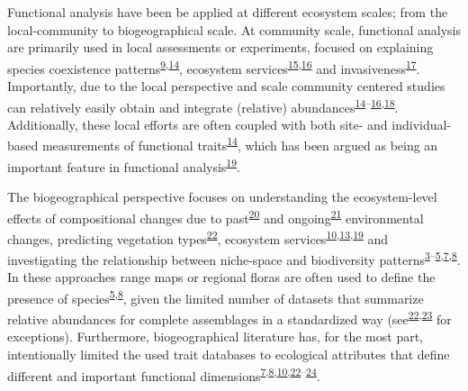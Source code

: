 \documentclass[
  10pt,
]{article}
\begin{document}
Functional analysis have been be applied at different ecosystem scales; from the local-community to biogeographical scale. At community scale, functional analysis are primarily used in local assessments or experiments, focused on explaining species coexistence patterns\textsuperscript{\protect\hyperlink{ref-McGill2006}{9},\protect\hyperlink{ref-Weiher1998}{14}}, ecosystem services\textsuperscript{\protect\hyperlink{ref-Scherer2008}{15},\protect\hyperlink{ref-Zavaleta2010}{16}} and invasiveness\textsuperscript{\protect\hyperlink{ref-Hejda2013}{17}}. Importantly, due to the local perspective and scale community centered studies can relatively easily obtain and integrate (relative) abundances\textsuperscript{\protect\hyperlink{ref-Weiher1998}{14}--\protect\hyperlink{ref-Zavaleta2010}{16},\protect\hyperlink{ref-Catford2019}{18}}. Additionally, these local efforts are often coupled with both site- and individual-based measurements of functional traits\textsuperscript{\protect\hyperlink{ref-Weiher1998}{14}}, which has been argued as being an important feature in functional analysis\textsuperscript{\protect\hyperlink{ref-Yang2018}{19}}.

The biogeographical perspective focuses on understanding the ecosystem-level effects of compositional changes due to past\textsuperscript{\protect\hyperlink{ref-Svenning2015}{20}} and ongoing\textsuperscript{\protect\hyperlink{ref-Culshaw2021}{21}} environmental changes, predicting vegetation types\textsuperscript{\protect\hyperlink{ref-Swenson2010}{22}}, ecosystem services\textsuperscript{\protect\hyperlink{ref-Paine2015}{10},\protect\hyperlink{ref-Violle2014}{13},\protect\hyperlink{ref-Yang2018}{19}} and investigating the relationship between niche-space and biodiversity patterns\textsuperscript{\protect\hyperlink{ref-Storch2019}{3}--\protect\hyperlink{ref-Ricklefs2012}{5},\protect\hyperlink{ref-Swenson2016}{7},\protect\hyperlink{ref-Ordonez2018}{8}}. In these approaches range maps or regional floras are often used to define the presence of species\textsuperscript{\protect\hyperlink{ref-Ricklefs2012}{5},\protect\hyperlink{ref-Ordonez2018}{8}}, given the limited number of datasets that summarize relative abundances for complete assemblages in a standardized way (see\textsuperscript{\protect\hyperlink{ref-Swenson2010}{22},\protect\hyperlink{ref-Swenson2012}{23}} for exceptions). Furthermore, biogeographical literature has, for the most part, intentionally limited the used trait databases to ecological attributes that define different and important functional dimensions\textsuperscript{\protect\hyperlink{ref-Swenson2016}{7},\protect\hyperlink{ref-Ordonez2018}{8},\protect\hyperlink{ref-Paine2015}{10},\protect\hyperlink{ref-Swenson2010}{22}--\protect\hyperlink{ref-Blonder2018}{24}}.
\end{document}

